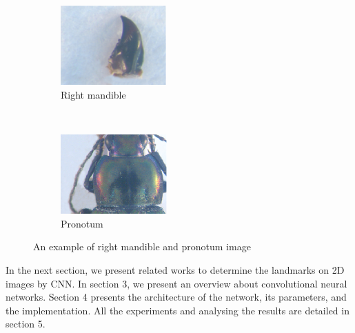\documentclass[conference]{IEEEtran}
\begin{document}
\begin{figure}[htbp]
    \centering
    \begin{subfigure}[t]{0.25\textwidth}
        \centering
        \includegraphics[height=1.2in]{images/md19}
        \caption{Right mandible}
        \label{figsub01}
    \end{subfigure}%
    ~ 
    \begin{subfigure}[t]{0.25\textwidth}
        \centering
        \includegraphics[height=1.2in]{images/prono60}
        \caption{Pronotum }
        \label{figsub02}
    \end{subfigure}
    \caption{An example of right mandible and pronotum image}
    \label{figsub012}
\end{figure}

In the next section, we present related works to determine the landmarks on 2D images by CNN. In section 3, we present an overview about convolutional neural networks. Section 4 presents the architecture of the network, its parameters, and the implementation. All the experiments and analysing the results are detailed in section 5.
\end{document}
